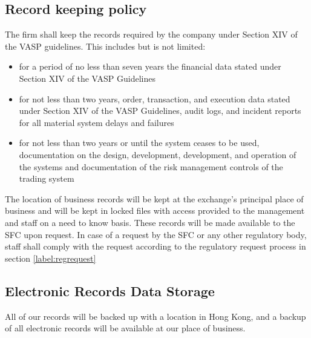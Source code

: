 \subsection{Record keeping policy}
The firm shall keep the records required by the company under Section
XIV of the VASP guidelines.  This includes but is not limited:
\label{label:reckeep}

\begin{itemize}
  \item for a period of no less than seven years the financial data
    stated under Section XIV of the VASP Guidelines
  \item for not less than two years, order, transaction, and execution
    data stated under Section XIV of the VASP Guidelines, audit logs, and incident reports for all material system delays and failures
  \item for not less than two years or until the system ceases to be
    used, documentation on the design, development, development, and
    operation of the systems and documentation of the risk management
    controls of the trading system
\end{itemize}

The location of business records will be kept at the exchange's principal
place of business and will be kept in locked files with access
provided to the management and staff on a need to know basis.  These
records will be made available to the SFC upon request.  In case of a
request by the SFC or any other regulatory body, staff shall comply
with the request according to the regulatory request process in
section \ref{label:regrequest}

\subsection{Electronic Records Data Storage}
All of our records will be backed up with a location in Hong Kong, and
a backup of all electronic records will be available at our place of business.
